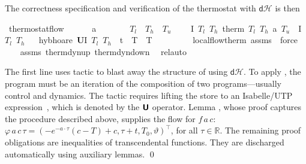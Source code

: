 \documentclass[envcountsame,envcountsect]{llncs}
\newcommand{\dH}{\mathsf{d}\mathcal{H}}
\newcommand{\flow}{\varphi}
\newcommand{\reals}{\mathbb{R}}
\newcommand{\isactrlU}{\textbf{\textsf{U}}}
\begin{document}
\begin{example}
\noindent The correctness specification and verification of the
thermostat with $\dH$  is then
\begin{isabellebody}
\isanewline
{}\isamarkupfalse%
\ thermostat{\isacharunderscore}flow{\isacharcolon}\ \isanewline
\ \ \ {\isachardoublequoteopen}{}\ {\isacharless}\ a{\isachardoublequoteclose}\ \ {\isachardoublequoteopen}{}\ {\isasymle}\ {\isasymtau}{\isachardoublequoteclose}\ \ {\isachardoublequoteopen}{}\ {\isacharless}\ $T_l${\isachardoublequoteclose}\ \ {\isachardoublequoteopen}$T_h$\ {\isacharless}\ $T_u${\isachardoublequoteclose}\isanewline
\ \ \ {\isachardoublequoteopen}\ \isactrlbold {\isacharbraceleft}I\ $T_l$\ $T_h$\isactrlbold {\isacharbraceright}\ therm\ $T_l$\ $T_h$\ a\ $T_u$\ {\isasymtau}\ \isactrlbold {\isacharbraceleft}I\ $T_l$\ $T_h$\isactrlbold {\isacharbraceright}{\isachardoublequoteclose}\isanewline
\ \ \isamarkupfalse%
{\isacharparenleft}hyb{\isacharunderscore}hoare\ {\isachardoublequoteopen}{\isactrlU}{\isacharparenleft}I\ $T_l$\ $T_h$\ {\isasymand}\ t{\isacharequal}{}\ {\isasymand}\ T\ {\isacharequal}\ T{\isacharparenright}{\isachardoublequoteclose}{\isacharparenright}\isanewline
\ \ \isamarkupfalse%
\ {}\ \isamarkupfalse%
\ {}\ \isamarkupfalse%
\ local{\isacharunderscore}flow{\isacharunderscore}therm\ assms\ \isamarkupfalse\ force{\isacharplus}\isanewline
\ \ \isamarkupfalse%
\ assms\ therm{\isacharunderscore}dyn{\isacharunderscore}up\ therm{\isacharunderscore}dyn{\isacharunderscore}down\ \isamarkupfalse%
\ rel{\isacharunderscore}auto{\isacharprime}\isanewline
\end{isabellebody}

\noindent The first line uses tactic  to blast away the
structure of  using $\dH$. To apply , the
program must be an iteration of the composition of two
programs---usually control and dynamics. The tactic requires lifting
the store to an Isabelle/UTP expression~\cite{FosterZW16}, which is
denoted by the $\isactrlU$ operator. Lemma ,
whose proof captures the procedure described above, supplies the flow
for $f\, a\, c$:
$\flow\, a\, c\, \tau = (-e^{-a\cdot\tau}(c-T)+c, \tau+t, T_0,
\vartheta)^\top$,
for all $\tau\in\reals$. The remaining proof obligations are
inequalities of transcendental functions. They are discharged
automatically using auxiliary lemmas. \qed
\end{example}
\end{document}
